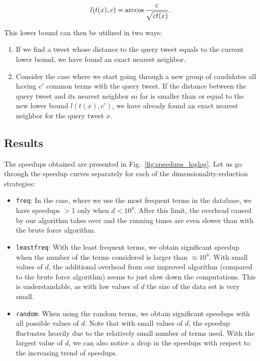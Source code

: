 \documentclass{article}
\begin{document}
\begin{equation}
l(t(x), c) = \arccos{{c}\over \sqrt{c t(x)}}.
\label{eq:ubound}
\end{equation}

This lower bound can then be utilized in two ways:
\begin{enumerate}
\item If we find a tweet whose distance to the query tweet equals to the current lower bound, we have found an exact nearest neighbor.
\item Consider the case where we start going through a new group of candidates all having $c'$ common terms with the query tweet.
If the distance between the query tweet and its nearest neighbor so far is smaller than or equal to the new lower bound $l(t(x), c')$,
we have already found an exact nearest neighbor for the query tweet $x$.
\end{enumerate}

\subsection*{Results}

The speedups obtained are presented in Fig.~\ref{fig:speedups_loglog}. Let us go through the speedup curves separately for each of the dimensionality-reduction strategies:
\begin{itemize}
\item \verb!freq!: In the case, where we use the most frequent terms in the database, we have speedups $> 1$ only when $d < 10^4$.
After this limit, the overhead caused by our algorithm takes over and the running times are even slower than with the brute force algorithm.
\item \verb!leastfreq!: With the least frequent terms, we obtain significant speedup when the number of the terms considered is larger than $\approx 10^4$.
With small values of $d$, the additional overhead from our improved algorithm (compared to the brute force algorithm) seems to just slow down the computations.
This is understandable, as with low values of $d$ the size of the data set is very small.
\item \verb!random!: When using the random terms, we obtain significant speedups with all possible values of $d$.
Note that with small values of $d$, the speedup fluctuates heavily due to the relatively small number of terms used.
With the largest value of $d$, we can also notice a drop in the speedups with respect to the increasing trend of speedups.
\end{itemize}
\end{document}
